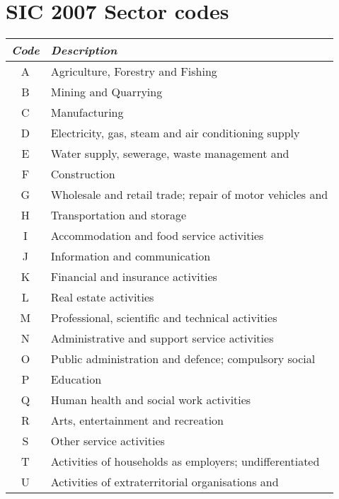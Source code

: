 \section{SIC 2007 Sector codes}
\label{app:sector_codes}

    \begin{centering}
    \scriptsize{
    \label{tab:sector-codes}
    \begin{tabular}{|c|l|}\hline 
    \emph{Code} & \emph{Description} \\ \hline 
A & Agriculture, Forestry and Fishing \\
B & Mining and Quarrying \\
C & Manufacturing \\
D & Electricity, gas, steam and air conditioning supply \\
E & Water supply, sewerage, waste management and \\
F & Construction \\
G & Wholesale and retail trade; repair of motor vehicles and \\
H & Transportation and storage \\
I & Accommodation and food service activities \\
J & Information and communication \\
K & Financial and insurance activities \\
L & Real estate activities \\
M & Professional, scientific and technical activities \\
N & Administrative and support service activities \\
O & Public administration and defence; compulsory social \\
P & Education \\
Q & Human health and social work activities \\
R & Arts, entertainment and recreation \\
S & Other service activities \\
T & Activities of households as employers; undifferentiated \\
U & Activities of extraterritorial organisations and \\
\hline
    \end{tabular} 
    }

\end{centering}